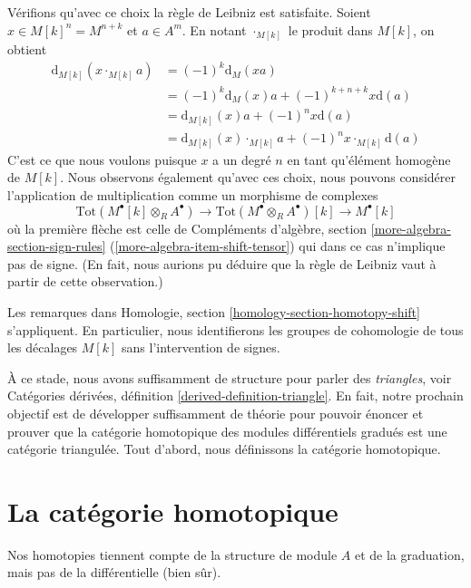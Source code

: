 \noindent
Vérifions qu'avec ce choix la règle de Leibniz est satisfaite.
Soient $x \in M[k]^n = M^{n + k}$ et $a \in A^m$. En notant
$\cdot_{M[k]}$ le produit dans $M[k]$, on obtient
\begin{align*}
\text{d}_{M[k]}(x \cdot_{M[k]} a)
& =
(-1)^k \text{d}_M(xa) \\
& =
(-1)^k \text{d}_M(x) a + (-1)^{k + n + k} x \text{d}(a) \\ & =
\text{d}_{M[k]}(x)
a + (-1)^n x \text{d}(a) \\ & =
\text{d}_{M[k]}(x)
\cdot_{M[k]} a + (-1)^n x \cdot_{M[k]} \text{d}(a)
\end{align*}
C'est ce que nous voulons puisque $x$ a un degré $n$ en tant qu'élément homogène de $M[k]$. Nous
observons également qu'avec ces choix, nous pouvons considérer
l'application de multiplication comme un morphisme de complexes
$$
\text{Tot}(M^\bullet[k] \otimes _R A^\bullet) \to
\text{Tot}(M^\bullet \otimes _R A^\bullet)[k] \to
M^\bullet[k]
$$
où la première flèche est
celle de Compléments d'algèbre, section
\ref{more-algebra-section-sign-rules} (\ref{more-algebra-item-shift-tensor}) qui dans ce
cas n'implique pas de signe. (En fait, nous aurions pu déduire que la
règle de Leibniz vaut à partir de cette observation.)

\medskip\noindent
Les remarques dans Homologie, section \ref{homology-section-homotopy-shift}
s'appliquent. En particulier, nous identifierons les groupes de cohomologie de tous les
décalages $M[k]$ sans l'intervention de signes.

\medskip\noindent
À ce stade, nous avons suffisamment de structure pour parler des {\it triangles},
voir Catégories dérivées, définition \ref{derived-definition-triangle}. En fait,
notre prochain objectif est de développer suffisamment de théorie pour pouvoir
énoncer et prouver que la catégorie homotopique des modules différentiels gradués
est une catégorie triangulée. Tout d'abord, nous définissons la catégorie homotopique.






\section{La catégorie homotopique}
\label{section-homotopy}

\noindent
Nos homotopies tiennent compte de la structure de module $A$ et de la
graduation, mais pas de la différentielle (bien sûr).

